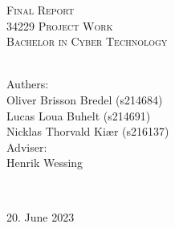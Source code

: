 \begin{titlepage}
\textsc{\Large Final Report}\\[1.5cm]

\textsc{\Large34229 Project Work\\ Bachelor in Cyber Technology}\\
\textsc{\Large }\\[1.5cm]


\begin{minipage}{0.5\textwidth}
        \begin{flushleft}
            \centering
            \large
            Authers:\\
            Oliver Brisson Bredel (s214684) \\[0.2cm]
            Lucas Loua Buhelt (s214691) \\[0.2cm]
            Nicklas Thorvald Kiær (s216137) \\[0.2cm]
            \hfill \break
            Adviser: 
            \\Henrik Wessing \\[0.2cm]
        \end{flushleft}
\end{minipage}
\\[1cm]
\vfill \vfill

{\large 20. June 2023}

\vfill

\end{titlepage}